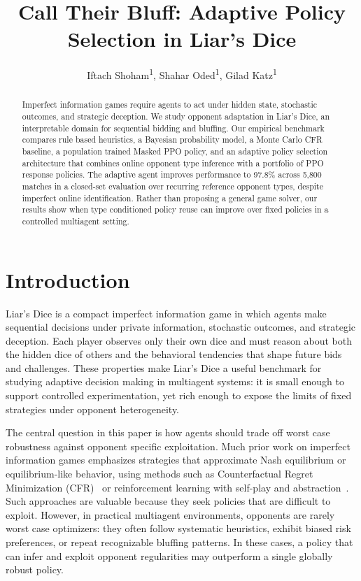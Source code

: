 \documentclass[letterpaper]{article} %
\title{Call Their Bluff: Adaptive Policy Selection in Liar’s Dice}
\author{
Iftach Shoham\textsuperscript{\rm 1}\equalcontrib,
Shahar Oded\textsuperscript{\rm 1}\equalcontrib,
Gilad Katz\textsuperscript{\rm 1}
}
\begin{document}
\maketitle



\begin{abstract}
Imperfect information games require agents to act under hidden state, stochastic outcomes, and strategic deception. We study opponent adaptation in Liar's Dice, an interpretable domain for sequential bidding and bluffing. Our empirical benchmark compares rule based heuristics, a Bayesian probability model, a Monte Carlo CFR baseline, a population trained Masked PPO policy, and an adaptive policy selection architecture that combines online opponent type inference with a portfolio of PPO response policies. The adaptive agent improves performance to 97.8\% across 5,800 matches in a closed-set evaluation over recurring reference opponent types, despite imperfect online identification. Rather than proposing a general game solver, our results show when type conditioned policy reuse can improve over fixed policies in a controlled multiagent setting.
\end{abstract}




\section{Introduction}

Liar’s Dice is a compact imperfect information game in which agents make sequential decisions under private information, stochastic outcomes, and strategic deception. Each player observes only their own dice and must reason about both the hidden dice of others and the behavioral tendencies that shape future bids and challenges. These properties make Liar’s Dice a useful benchmark for studying adaptive decision making in multiagent systems: it is small enough to support controlled experimentation, yet rich enough to expose the limits of fixed strategies under opponent heterogeneity.

The central question in this paper is how agents should trade off worst case robustness against opponent specific exploitation. Much prior work on imperfect information games emphasizes strategies that approximate Nash equilibrium or equilibrium-like behavior, using methods such as Counterfactual Regret Minimization (CFR)~\cite{cfr} or reinforcement learning with self-play and abstraction~\cite{heinrich2016deep}. Such approaches are valuable because they seek policies that are difficult to exploit. However, in practical multiagent environments, opponents are rarely worst case optimizers: they often follow systematic heuristics, exhibit biased risk preferences, or repeat recognizable bluffing patterns. In these cases, a policy that can infer and exploit opponent regularities may outperform a single globally robust policy.
\end{document}
